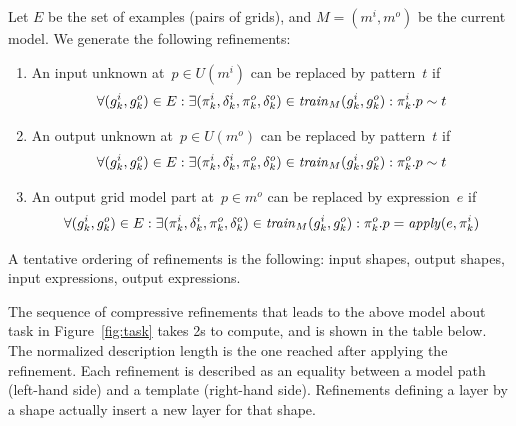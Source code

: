 \documentclass[a4paper]{llncs}
\begin{document}
Let $E$ be the set of examples (pairs of grids), and $M = (m^i,m^o)$
be the current model. We generate the following refinements:
\begin{enumerate}
\item An input unknown at~$p \in U(m^i)$ can be replaced by
  pattern~$t$ if
\[ \forall (g^i_k,g^o_k) \in E: \exists (\pi^i_k,\delta^i_k,\pi^o_k,\delta^o_k) \in {\it
    train}_M(g^i_k,g^o_k): \pi^i_k.p \sim t \]
%
\item An output unknown at~$p \in U(m^o)$ can be replaced by
pattern~$t$ if
\[ \forall (g^i_k,g^o_k) \in E: \exists (\pi^i_k,\delta^i_k,\pi^o_k,\delta^o_k) \in {\it
    train}_M(g^i_k,g^o_k): \pi^o_k.p \sim t \]
%
\item An output grid model part at~$p \in m^o$ can be replaced by expression~$e$ if
\[ \forall (g^i_k,g^o_k) \in E: \exists (\pi^i_k,\delta^i_k,\pi^o_k,\delta^o_k) \in {\it
    train}_M(g^i_k,g^o_k): \pi^o_k.p = {\it apply}(e, \pi^i_k) \]
\end{enumerate}

A tentative ordering of refinements is the following: input shapes,
output shapes, input expressions, output expressions.

The sequence of compressive refinements that leads to the above model
about task in Figure~\ref{fig:task} takes 2s to compute, and is
shown in the table below. The normalized description length is the one
reached after applying the refinement. Each refinement is described as
an equality between a model path (left-hand side) and a template
(right-hand side). Refinements defining a layer by a shape actually
insert a new layer for that shape.
\end{document}
